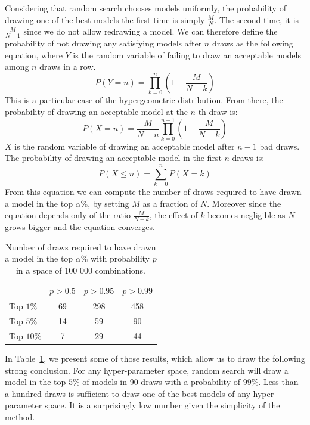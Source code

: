 Considering that random search chooses models uniformly, the probability of drawing one of the best models the first time is simply $\frac{M}{N}$. The second time, it is $\frac{M}{N - 1}$ since we do not allow redrawing a model. We can therefore define the probability of not drawing any satisfying models after $n$ draws as the following equation, where $Y$ is the random variable of failing to draw an acceptable models among $n$ draws in a row.
\begin{equation}
    P \left( Y = n \right) = \prod_{k = 0}^{n} \left( 1 -  \frac{M}{N - k} \right)
\end{equation}
This is a particular case of the hypergeometric distribution. From there, the probability of drawing an acceptable model at the $n$-th draw is:
\begin{equation}
    P\left(X = n \right) = \frac{M}{N - n} \prod_{k = 0}^{n - 1} \left( 1 -  \frac{M}{N - k} \right)
\end{equation}
$X$ is the random variable of drawing an acceptable model after $n - 1$ bad draws. The probability of drawing an acceptable model in the first $n$ draws is:
\begin{equation}
    P\left(X \leq n \right) = \sum_{k = 0}^{n} P\left(X = k \right)
\end{equation}
From this equation we can compute the number of draws required to have drawn a model in the top $\alpha \%$, by setting $M$ as a fraction of $N$. Moreover since the equation depends only of the ratio $\frac{M}{N - k}$, the effect of $k$ becomes negligible as $N$ grows bigger and the equation converges.

\begin{table}[htb]
	\centering
	\begin{tabular}{ | l | c | c | c | }
		\hline
		 & $p > 0.5$ & $p > 0.95$ & $p > 0.99$ \\ 
		\hline
		Top $1 \%$ & 69 & 298 & 458 \\
		Top $5 \%$ & 14 & 59 & 90 \\
		Top $10 \%$ & 7 & 29 & 44 \\
		\hline
	\end{tabular}
	\caption{Number of draws required to have drawn a model in the top $\alpha \%$ with probability $p$ in a space of 100 000 combinations.}
	\label{table:random_search_bounds}
\end{table}

In Table~\ref{table:random_search_bounds}, we present some of those results, which allow us to draw the following strong conclusion. For any hyper-parameter space, random search will draw a model in the top $5 \%$ of models in 90 draws with a probability of $99 \%$. Less than a hundred draws is sufficient to draw one of the best models of any hyper-parameter space. It is a surprisingly low number given the simplicity of the method.

